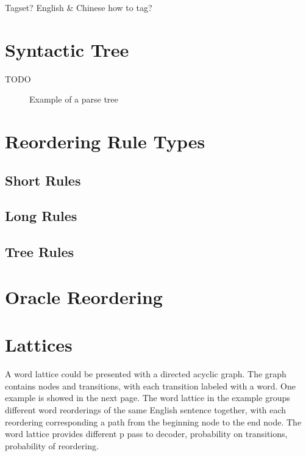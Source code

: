 Tagset? English \& Chinese how to tag?


\label{ch:Foundations:sec:PosTag}

\section{Syntactic Tree}
\label{ch:Foundations:sec:SyntacticTree}

TODO

\begin{figure}[H]
\centering

\caption{Example of a parse tree}
\end{figure}


\section{Reordering Rule Types}
\label{ch:Foundations:sec:types}

\subsection{Short Rules}
\subsection{Long Rules}
\subsection{Tree Rules}
\label{treerules}

\section{Oracle Reordering}
\label{ch:Foundations:sec:oracle}



\section{Lattices}
\label{ch:Foundations:sec:Lattices}
A word lattice could be presented with a directed acyclic graph. The graph contains nodes and transitions, with each transition labeled with a word. One example is showed in the next page. The word lattice in the example groups different word reorderings of the same English sentence together, with each reordering corresponding a path from the beginning node to the end node. The word lattice provides different p 
pass to decoder,
probability on transitions,
probability of reordering.

